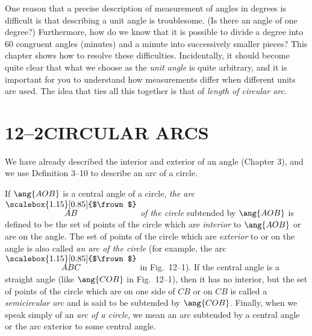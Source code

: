 \documentclass[11pt]{book}
\theoremstyle{bkplain}
\theoremstyle{XIplainnote}
\theoremstyle{bkplain}
\newcommand{\XIIarc}[1]{\overset{\raisebox{-0.25ex}{\scalebox{1.15}[0.85]{$\frown$}}}{#1}}
\theoremstyle{bkplain}
\begin{document}
One reason that a precise description of measurement of angles in degrees is
difficult is that describing a unit angle is troublesome. (Is there an angle of
one degree?) Furthermore, how do we know that it is possible to divide a degree
into 60 congruent angles (minutes) and a minute into successively smaller
pieces? This chapter shows how to resolve these difficulties. Incidentally, it
should become quite clear that what we choose as the \emph{unit angle} is quite
arbitrary, and it is important for you to understand how measurements differ
when different units are used. The idea that ties all this together is that of
\emph{length of circular arc}.

\section*{12--2\quad CIRCULAR ARCS}

We have already described the interior and exterior of an angle (Chapter 3),
and we use Definition 3--10 to describe an arc of a circle.

\begin{definition}
If $\ang{AOB}$ is a central angle of a circle, \emph{the arc $\XIIarc{AB}$ of
the circle} subtended by $\ang{AOB}$ is defined to be the set of points of the
circle which are \emph{interior} to $\ang{AOB}$ or are on the angle. The set of
points of the circle which are \emph{exterior} to or on the angle is also called
\emph{an arc of the circle} (for example, the arc $\XIIarc{ABC}$ in
Fig.~12--1). If the central angle is a straight angle (like $\ang{COB}$ in
Fig.~12--1), then it has no interior, but the set of points of the circle which
are on one side of $CB$ or on $CB$ is called a \emph{semicircular arc} and is
said to be subtended by $\ang{COB}$. Finally, when we speak simply of an
\emph{arc of a circle}, we mean an arc subtended by a central angle or the arc
exterior to some central angle.
\end{definition}

\FIGXIIONE
\end{document}
